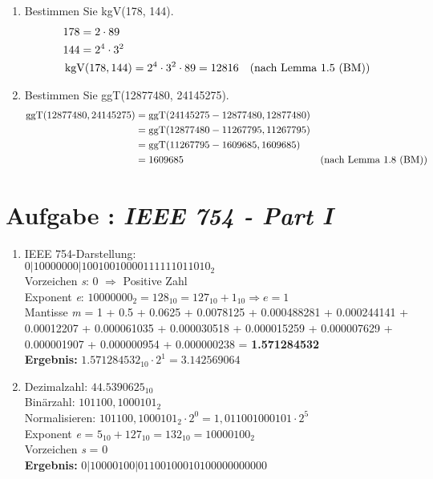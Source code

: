 \begin{enumerate}[label=(\alph*)]
		\item Bestimmen Sie kgV(178, 144).
		\begin{align*}
			& 178 = 2\cdot89 \\
			& 144 = 2^4\cdot3^2 \\
			&\operatorname{kgV}(178, 144) = 2^4\cdot3^2\cdot89 = 12816
		 	&\textrm{(nach Lemma 1.5 (BM))}
		\end{align*}

		\item Bestimmen Sie ggT(12877480, 24145275).
		\begin{align*}
			\operatorname{ggT}(12877480, 24145275) &= \operatorname{ggT}(24145275-12877480, 12877480)
			\\& = \operatorname{ggT}(12877480-11267795,11267795)
			\\& = \operatorname{ggT}(11267795-1609685,1609685)
			\\& = 1609685
		 	&\textrm{(nach Lemma 1.8 (BM))}
		\end{align*}
		
	\end{enumerate} 
	
	\section*{Aufgabe : \textnormal{\textit{IEEE 754 - Part I}}}
	\begin{enumerate}[label=(\alph*)]
		\item %
		IEEE 754-Darstellung: \\
		$0|10000000|10010010000111111011010_2$ \\
		Vorzeichen \textit s: 0 $\Rightarrow$ Positive Zahl\\
		Exponent \textit e: $1000 0000_2 = 128_{10} = 127_{10}+1_{10} \Rightarrow e = 1$ \\
		Mantisse \textit m = 1 + 0.5 + 0.0625 + 0.0078125 + 0.000488281 + 0.000244141 + 0.00012207 + 0.000061035 + 0.000030518 + 0.000015259 + 0.000007629 + 0.000001907 + 0.000000954 + 0.000000238 = \textbf{1.571284532}\\
		\textbf{Ergebnis:} $1.571284532_{10} \cdot 2^1 = 3.142569064$
		\item Dezimalzahl: $44.5390625_{10}$\\
		Binärzahl: $101100,1000101_2$\\
		Normalisieren: $101100,1000101_2 \cdot 2^0 = 1,011001000101 \cdot 2^5$\\
		Exponent \textit e = $5_{10} + 127_{10} = 132_{10} =  1000 0100_2$\\
		Vorzeichen \textit s = 0\\
		\textbf{Ergebnis:} $0|1000 0100|01100100010100000000000$
	\end{enumerate} 
	
